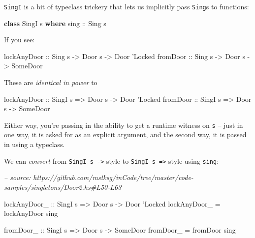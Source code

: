 \documentclass[]{article}
\newenvironment{Shaded}{}{}
\newcommand{\CharTok}[1]{\textcolor[rgb]{0.25,0.44,0.63}{#1}}
\newcommand{\CommentTok}[1]{\textcolor[rgb]{0.38,0.63,0.69}{\textit{#1}}}
\newcommand{\DataTypeTok}[1]{\textcolor[rgb]{0.56,0.13,0.00}{#1}}
\newcommand{\FunctionTok}[1]{\textcolor[rgb]{0.02,0.16,0.49}{#1}}
\newcommand{\KeywordTok}[1]{\textcolor[rgb]{0.00,0.44,0.13}{\textbf{#1}}}
\newcommand{\NormalTok}[1]{#1}
\newcommand{\OtherTok}[1]{\textcolor[rgb]{0.00,0.44,0.13}{#1}}
\begin{document}
\texttt{SingI} is a bit of typeclass trickery that lets us implicitly pass
\texttt{Sing}s to functions:

\begin{Shaded}
\begin{Highlighting}[]
\KeywordTok{class} \DataTypeTok{SingI}\NormalTok{ s }\KeywordTok{where}
\OtherTok{    sing ::} \DataTypeTok{Sing}\NormalTok{ s}
\end{Highlighting}
\end{Shaded}

If you see:

\begin{Shaded}
\begin{Highlighting}[]
\OtherTok{lockAnyDoor ::} \DataTypeTok{Sing}\NormalTok{  s }\OtherTok{->} \DataTypeTok{Door}\NormalTok{ s }\OtherTok{->} \DataTypeTok{Door} \CharTok{'Locked}
\OtherTok{fromDoor    ::} \DataTypeTok{Sing}\NormalTok{  s }\OtherTok{->} \DataTypeTok{Door}\NormalTok{ s }\OtherTok{->} \DataTypeTok{SomeDoor}
\end{Highlighting}
\end{Shaded}

These are \emph{identical in power} to

\begin{Shaded}
\begin{Highlighting}[]
\OtherTok{lockAnyDoor ::} \DataTypeTok{SingI}\NormalTok{ s }\OtherTok{=>} \DataTypeTok{Door}\NormalTok{ s }\OtherTok{->} \DataTypeTok{Door} \CharTok{'Locked}
\OtherTok{fromDoor    ::} \DataTypeTok{SingI}\NormalTok{ s }\OtherTok{=>} \DataTypeTok{Door}\NormalTok{ s }\OtherTok{->} \DataTypeTok{SomeDoor}
\end{Highlighting}
\end{Shaded}

Either way, you're passing in the ability to get a runtime witness on \texttt{s}
-- just in one way, it is asked for as an explicit argument, and the second way,
it is passed in using a typeclass.

We can \emph{convert} from \texttt{SingI\ s\ -\textgreater{}} style to
\texttt{SingI\ s\ =\textgreater{}} style using \texttt{sing}:

\begin{Shaded}
\begin{Highlighting}[]
\CommentTok{-- source: https://github.com/mstksg/inCode/tree/master/code-samples/singletons/Door2.hs#L50-L63}

\OtherTok{lockAnyDoor_ ::} \DataTypeTok{SingI}\NormalTok{ s }\OtherTok{=>} \DataTypeTok{Door}\NormalTok{ s }\OtherTok{->} \DataTypeTok{Door} \CharTok{'Locked}
\NormalTok{lockAnyDoor_ }\FunctionTok{=}\NormalTok{ lockAnyDoor sing}

\OtherTok{fromDoor_ ::} \DataTypeTok{SingI}\NormalTok{ s }\OtherTok{=>} \DataTypeTok{Door}\NormalTok{ s }\OtherTok{->} \DataTypeTok{SomeDoor}
\NormalTok{fromDoor_ }\FunctionTok{=}\NormalTok{ fromDoor sing}
\end{Highlighting}
\end{Shaded}
\end{document}
